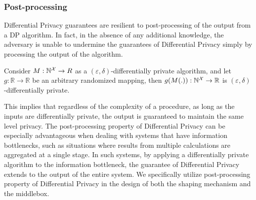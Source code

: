 \subsubsection{Post-processing}
\label{subsubsec:background-dp-postprocessing}
Differential Privacy guarantees are resilient to post-processing of the output from a DP algorithm.
In fact, in the absence of any additional knowledge, the adversary is unable to undermine the guarantees of Differential Privacy simply by processing the output of the algorithm.
\begin{proposition}
  \label{prop:post-processing}
  Consider $M: \mathbb{N}^\mathcal{X} \rightarrow R$ as a $(\varepsilon, \delta)$-differentially private algorithm, and let $g: \mathbb{R} \rightarrow \mathbb{R}$ be an arbitrary randomized mapping, then $g(M(.)): \mathbb{N}^\mathcal{X} \rightarrow \mathbb{R}$ is $(\varepsilon, \delta)$-differentially private. 
\end{proposition}
\noindent
This implies that regardless of the complexity of a procedure, as long as the inputs are differentially private, the output is guaranteed to maintain the same level privacy.
The post-processing property of Differential Privacy can be especially advantageous when dealing with systems that have information bottlenecks, such as situations where results from multiple calculations are aggregated at a single stage.
In such systems, by applying a differentially private algorithm to the information bottleneck, the guarantee of Differential Privacy extends to the output of the entire system. 
We specifically utilize post-processing property of Differential Privacy in the design of both the {\sys} shaping mechanism and the {\sys} middlebox. 

